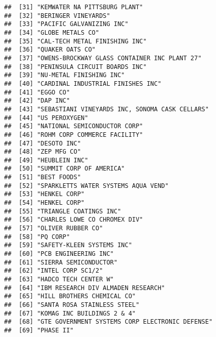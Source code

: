 \documentclass[
]{book}
\begin{document}
\begin{verbatim}
##  [31] "KEMWATER NA PITTSBURG PLANT"                             
##  [32] "BERINGER VINEYARDS"                                      
##  [33] "PACIFIC GALVANIZING INC"                                 
##  [34] "GLOBE METALS CO"                                         
##  [35] "CAL-TECH METAL FINISHING INC"                            
##  [36] "QUAKER OATS CO"                                          
##  [37] "OWENS-BROCKWAY GLASS CONTAINER INC PLANT 27"             
##  [38] "PENINSULA CIRCUIT BOARDS INC"                            
##  [39] "NU-METAL FINISHING INC"                                  
##  [40] "CARDINAL INDUSTRIAL FINISHES INC"                        
##  [41] "EGGO CO"                                                 
##  [42] "DAP INC"                                                 
##  [43] "SEBASTIANI VINEYARDS INC, SONOMA CASK CELLARS"           
##  [44] "US PEROXYGEN"                                            
##  [45] "NATIONAL SEMICONDUCTOR CORP"                             
##  [46] "ROHM CORP COMMERCE FACILITY"                             
##  [47] "DESOTO INC"                                              
##  [48] "ZEP MFG CO"                                              
##  [49] "HEUBLEIN INC"                                            
##  [50] "SUMMIT CORP OF AMERICA"                                  
##  [51] "BEST FOODS"                                              
##  [52] "SPARKLETTS WATER SYSTEMS AQUA VEND"                      
##  [53] "HENKEL CORP"                                             
##  [54] "HENKEL CORP"                                             
##  [55] "TRIANGLE COATINGS INC"                                   
##  [56] "CHARLES LOWE CO CHROMEX DIV"                             
##  [57] "OLIVER RUBBER CO"                                        
##  [58] "PQ CORP"                                                 
##  [59] "SAFETY-KLEEN SYSTEMS INC"                                
##  [60] "PCB ENGINEERING INC"                                     
##  [61] "SIERRA SEMICONDUCTOR"                                    
##  [62] "INTEL CORP SC1/2"                                        
##  [63] "HADCO TECH CENTER W"                                     
##  [64] "IBM RESEARCH DIV ALMADEN RESEARCH"                       
##  [65] "HILL BROTHERS CHEMICAL CO"                               
##  [66] "SANTA ROSA STAINLESS STEEL"                              
##  [67] "KOMAG INC BUILDINGS 2 & 4"                               
##  [68] "GTE GOVERNMENT SYSTEMS CORP ELECTRONIC DEFENSE"          
##  [69] "PHASE II"                                                

\end{verbatim}
\end{document}
